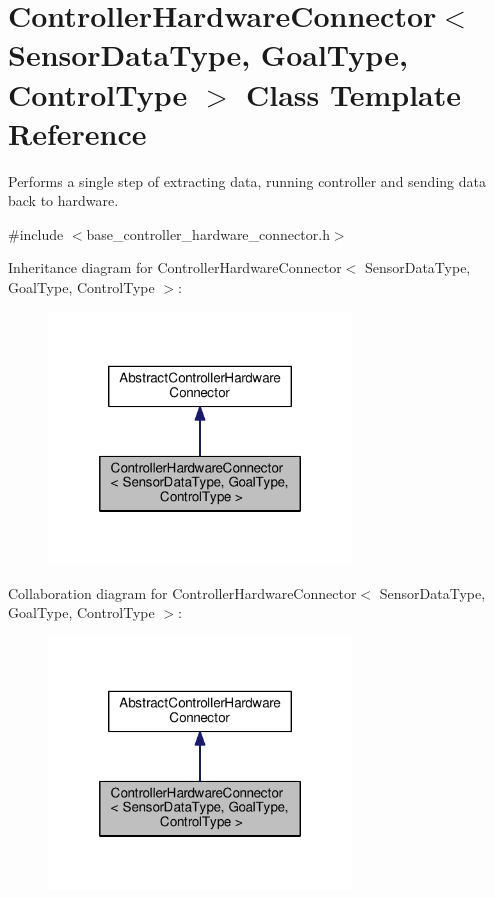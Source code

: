 \hypertarget{classControllerHardwareConnector}{\section{Controller\-Hardware\-Connector$<$ Sensor\-Data\-Type, Goal\-Type, Control\-Type $>$ Class Template Reference}
\label{classControllerHardwareConnector}
}


Performs a single step of extracting data, running controller and sending data back to hardware.  




{\ttfamily \#include $<$base\-\_\-controller\-\_\-hardware\-\_\-connector.\-h$>$}



Inheritance diagram for Controller\-Hardware\-Connector$<$ Sensor\-Data\-Type, Goal\-Type, Control\-Type $>$\-:\nopagebreak
\begin{figure}[H]
\begin{center}
\leavevmode
\includegraphics[width=228pt]{classControllerHardwareConnector__inherit__graph}
\end{center}
\end{figure}


Collaboration diagram for Controller\-Hardware\-Connector$<$ Sensor\-Data\-Type, Goal\-Type, Control\-Type $>$\-:\nopagebreak
\begin{figure}[H]
\begin{center}
\leavevmode
\includegraphics[width=228pt]{classControllerHardwareConnector__coll__graph}
\end{center}
\end{figure}
